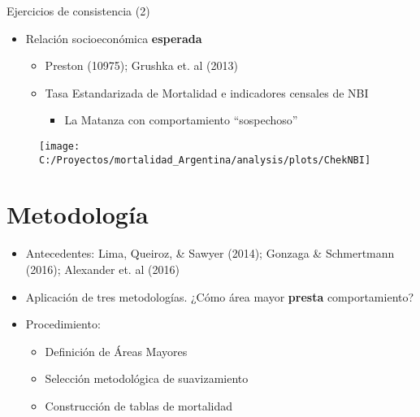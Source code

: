 \documentclass[10pt,ignorenonframetext,]{beamer}
\providecommand{\tightlist}{%
  \setlength{\itemsep}{0pt}\setlength{\parskip}{0pt}}
\begin{document}
\begin{frame}{Ejercicios de consistencia (2)}

\begin{itemize}[<+->]
\tightlist
\item
  Relación socioeconómica \textbf{esperada}

  \begin{itemize}[<+->]
  \tightlist
  \item
    Preston (10975); Grushka et. al (2013)
  \item
    Tasa Estandarizada de Mortalidad e indicadores censales de NBI

    \begin{itemize}[<+->]
    \tightlist
    \item
      La Matanza con comportamiento ``sospechoso''
    \end{itemize}
  \end{itemize}
\end{itemize}

\pause

\begin{figure}

{\centering \texttt{[image: C:/Proyectos/mortalidad\_Argentina/analysis/plots/ChekNBI]} 

}

\end{figure}

\end{frame}

\section{Metodología}\label{metodologia}

\begin{frame}

\begin{itemize}[<+->]
\tightlist
\item
  Antecedentes: Lima, Queiroz, \& Sawyer (2014); Gonzaga \& Schmertmann
  (2016); Alexander et. al (2016)
\item
  Aplicación de tres metodologías. ¿Cómo área mayor \textbf{presta}
  comportamiento?
\item
  Procedimiento:

  \begin{itemize}[<+->]
  \tightlist
  \item
    Definición de Áreas Mayores\\
  \item
    Selección metodológica de suavizamiento\\
  \item
    Construcción de tablas de mortalidad
  \end{itemize}
\end{itemize}

\end{frame}
\end{document}
